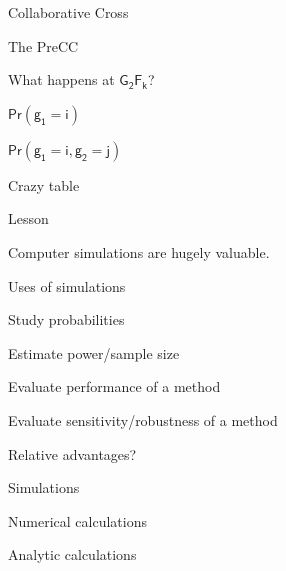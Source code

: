 \documentclass[aspectratio=169,12pt,t]{beamer}
\begin{document}
\begin{frame}[c]{Collaborative Cross}



\note{
}

\end{frame}


\begin{frame}{The PreCC}


\vspace{5mm}

{\large What happens at $\mathsf{G_2 F_k}$?}

\bbi

\item[]  $\mathsf{Pr(g_1 = i)}$ \qquad{}

\item[]  $\mathsf{Pr(g_1 = i, g_2 = j)}$ 
\ei


\note{
}

\end{frame}


\begin{frame}[c]{Crazy table}

\note{
}

\end{frame}


\begin{frame}[c]{Lesson}

  \centerline{\large Computer simulations are hugely valuable.}


\note{
}

\end{frame}



\begin{frame}[c]{Uses of simulations}

    \bbi
    \item Study probabilities
    \item Estimate power/sample size
    \item Evaluate performance of a method
    \item Evaluate sensitivity/robustness of a method
    \ei


\note{
}

\end{frame}



\begin{frame}[c]{Relative advantages?}

    \bbi
    \item Simulations
    \item Numerical calculations
    \item Analytic calculations
    \ei


\note{
}

\end{frame}
\end{document}
